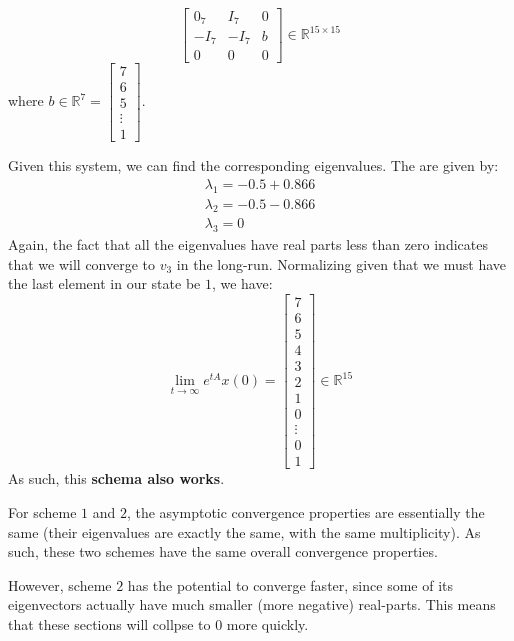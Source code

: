\documentclass[12pt]{exam}
\begin{document}
\begin{questions}
\begin{solution}
\begin{enumerate}[label=(\alph*)]
\begin{itemize}
\[\begin{bmatrix}
                0_{7} & I_{7} & 0 \\
                -I_{7} & -I_{7} & b \\
                0 & 0 & 0
              \end{bmatrix} \in \mathbb{R}^{15 \times 15}
          \] 
          where $b \in \mathbb{R}^{7} = \begin{bmatrix} 7 \\ 6 \\ 5 \\ \vdots \\ 1 \end{bmatrix}$.

          Given this system, we can find the corresponding eigenvalues. The are given by:
          \begin{align*}
            \lambda_1 = -0.5+0.866 \\
            \lambda_2 = -0.5-0.866 \\
            \lambda_3 = 0
          \end{align*}
          Again, the fact that all the eigenvalues have real parts less than zero indicates that we will converge to $v_3$ in the long-run. Normalizing given that we must have the last element in our state be $1$, we have:
          \[
            \lim_{t \to \infty} e^{tA}x(0) =
              \begin{bmatrix}
                7 \\
                6 \\
                5\\
                4\\
                3\\
                2\\
                1\\
                0 \\
                \vdots \\
                0 \\
                1
              \end{bmatrix} \in \mathbb{R}^{15}
          \]
          As such, this \textbf{schema also works}.
      \end{itemize}
      For scheme $1$ and $2$, the asymptotic convergence properties are essentially the same (their eigenvalues are exactly the same, with the same multiplicity). As such, these two schemes have the same overall convergence properties.

      However, scheme $2$ has the potential to converge faster, since some of its eigenvectors actually have much smaller (more negative) real-parts. This means that these sections will collpse to $0$ more quickly.


\end{enumerate}
\end{solution}
\end{questions}
\end{document}
